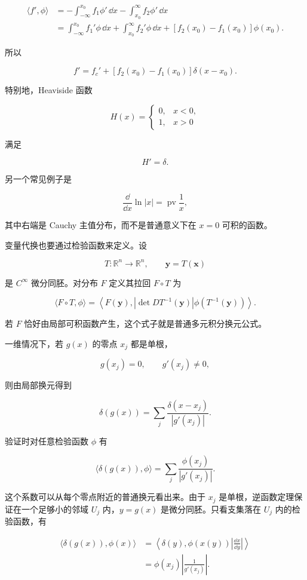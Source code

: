 \[
\begin{aligned}
\langle f',\phi\rangle
&=-\int_{-\infty}^{x_0}f_1\phi'\,\dd x
  -\int_{x_0}^{\infty}f_2\phi'\,\dd x\\
&=\int_{-\infty}^{x_0}f_1'\phi\,\dd x
  +\int_{x_0}^{\infty}f_2'\phi\,\dd x
  +[f_2(x_0)-f_1(x_0)]\phi(x_0).
\end{aligned}
\]

所以

\[
\boxed{
f'=f_c'+[f_2(x_0)-f_1(x_0)]\delta(x-x_0)
}.
\]

特别地，Heaviside 函数

\[
H(x)=
\begin{cases}0,&x<0,\\1,&x>0\end{cases}
\]

满足

\[
\boxed{H'=\delta}.
\]

另一个常见例子是

\[
\boxed{
\frac{\dd}{\dd x}\ln|x|
=\operatorname{pv}\frac1x
},
\]

其中右端是 Cauchy 主值分布，而不是普通意义下在 $x=0$ 可积的函数。

变量代换也要通过检验函数来定义。设

\[
T:\mathbb R^n\to\mathbb R^n,
\qquad \mathbf y=T(\mathbf x)
\]

是 $C^\infty$ 微分同胚。对分布 $F$ 定义其拉回 $F\circ T$ 为

\[
\boxed{
\langle F\circ T,\phi\rangle
=
\left\langle
F(\mathbf y),
\left|\det DT^{-1}(\mathbf y)\right|
\phi\!\left(T^{-1}(\mathbf y)\right)
\right\rangle
}.
\]

若 $F$ 恰好由局部可积函数产生，这个式子就是普通多元积分换元公式。

一维情况下，若 $g(x)$ 的零点 $x_j$ 都是单根，

\[
g(x_j)=0,
\qquad g'(x_j)\neq0,
\]

则由局部换元得到

\[
\boxed{
\delta(g(x))
=\sum_j\frac{\delta(x-x_j)}{|g'(x_j)|}
}.
\]

验证时对任意检验函数 $\phi$ 有

\[
\langle\delta(g(x)),\phi\rangle
=\sum_j\frac{\phi(x_j)}{|g'(x_j)|}.
\]

这个系数可以从每个零点附近的普通换元看出来。由于 $x_j$ 是单根，逆函数定理保证在一个足够小的邻域 $U_j$ 内，$y=g(x)$ 是微分同胚。只看支集落在 $U_j$ 内的检验函数，有

\[
\begin{aligned}
\langle\delta(g(x)),\phi(x)\rangle
&=\left\langle\delta(y),
\phi(x(y))\left|\frac{\dd x}{\dd y}\right|\right\rangle\\
&=\phi(x_j)\left|\frac1{g'(x_j)}\right|.
\end{aligned}
\]

